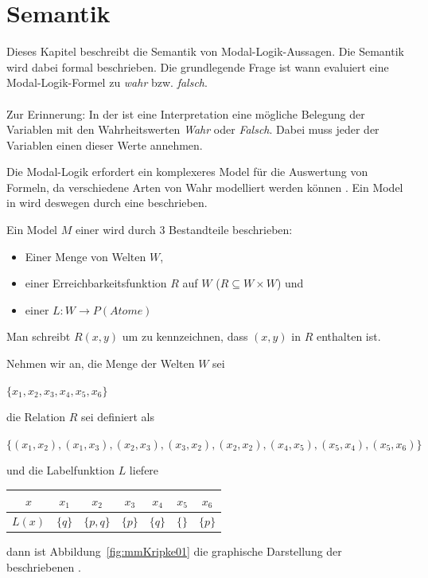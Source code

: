 
\section{Semantik} %
\label{sec:semantik}
Dieses Kapitel beschreibt die Semantik von Modal-Logik-Aussagen. 
Die Semantik wird dabei formal beschrieben. Die grundlegende Frage ist wann evaluiert eine Modal-Logik-Formel zu \emph{wahr} bzw. \emph{falsch}.\\
\\
Zur Erinnerung: In der \AL ist eine Interpretation eine mögliche Belegung der Variablen mit den Wahrheitswerten \emph{Wahr} oder \emph{Falsch}. Dabei muss jeder der Variablen einen dieser Werte annehmen.


Die Modal-Logik erfordert ein komplexeres Model für die Auswertung von Formeln, da verschiedene Arten von Wahr modelliert werden können .
Ein Model in \ML wird deswegen durch eine \KS beschrieben. 

\begin{definition}
	\label{def:model}
	Ein Model $M$ einer \ML wird durch 3 Bestandteile beschrieben:
	\begin{itemize}
		\item Einer Menge von Welten $W$,
		\item einer Erreichbarkeitsfunktion $R$ auf $W$ ($R \subseteq W \times W$) und
		\item einer  $L : W \rightarrow P(Atome)$
	\end{itemize}
	Man schreibt $R(x,y)$ um zu kennzeichnen, dass $(x,y)$ in $R$ enthalten ist. 
\end{definition}


Nehmen wir an, die Menge der Welten $W$ sei
\begin{center}
	$\{ x_1, x_2, x_3, x_4, x_5, x_6 \}$
\end{center}
%
%
die Relation $R$ sei definiert als 
\begin{center}
	$\{(x_1, x_2), (x_1, x_3), (x_2, x_3), (x_3, x_2), (x_2, x_2), (x_4, x_5), (x_5, x_4), (x_5, x_6)\}$ 
\end{center}
%
%
und die Labelfunktion $L$ liefere
\begin{center}
	\begin{tabular}{c|cccccc}
		$x$ & $x_1$ & $x_2$ & $x_3$ & $x_4$ & $x_5$ & $x_6$\\
		\hline
		$L(x)$ & $\{q\}$ & $\{p,q\}$ & $\{p\}$ & $\{q\}$ & $\{\}$ & $\{p\}$
	\end{tabular}
\end{center}
%
%
dann ist Abbildung~\ref{fig:mmKripke01} die graphische Darstellung der beschriebenen \KS.

